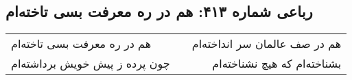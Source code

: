 \begin{center}
\section*{رباعی شماره ۴۱۳: هم در ره معرفت بسی تاخته‌ام}
\label{sec:sh413}
\begin{longtable}{l p{0.5cm} r}
هم در ره معرفت بسی تاخته‌ام
&&
هم در صف عالمان سر انداخته‌ام
\\
چون پرده ز پیش خویش برداشته‌ام
&&
بشناخته‌ام که هیچ نشناخته‌ام
\\
\end{longtable}
\end{center}

